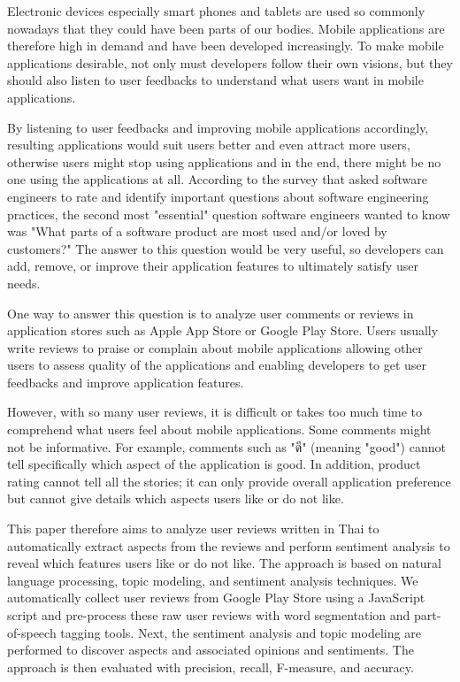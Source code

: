 
Electronic devices especially smart phones and tablets are used so commonly nowadays that they could have been parts of our bodies. Mobile applications are therefore high in demand and have been developed increasingly. To make mobile applications desirable, not only must developers follow their own visions, but they should also listen to user feedbacks to understand what users want in mobile applications.

By listening to user feedbacks and improving mobile applications accordingly, resulting applications would suit users better and even attract more users, otherwise users might stop using applications and in the end, there might be no one using the applications at all. According to the survey \cite{145Q} that asked software engineers to rate and identify important questions about software engineering practices, the second most "essential" question software engineers wanted to know was "What parts of a software product are most used and/or loved by customers?" The answer to this question would be very useful, so developers can add, remove, or improve their application features to ultimately satisfy user needs.

One way to answer this question is to analyze user comments or reviews in application stores such as Apple App Store or Google Play Store. Users usually write reviews to praise or complain about mobile applications allowing other users to assess quality of the applications and enabling developers to get user feedbacks and improve application features. 

However, with so many user reviews, it is difficult or takes too much time to comprehend what users feel about mobile applications. Some comments might not be informative. For example, comments such as "{ดี}" (meaning "good") cannot tell specifically which aspect of the application is good. In addition, product rating cannot tell all the stories; it can only provide overall application preference but cannot give details which aspects users like or do not like.

This paper therefore aims to analyze user reviews written in Thai to automatically extract aspects from the reviews and perform sentiment analysis to reveal which features users like or do not like. The approach is based on natural language processing, topic modeling, and sentiment analysis techniques. We automatically collect user reviews from Google Play Store using a JavaScript script and pre-process these raw user reviews with word segmentation and part-of-speech tagging tools. Next, the sentiment analysis and topic modeling are performed to discover aspects and associated opinions and sentiments. The approach is then evaluated with precision, recall, F-measure, and accuracy.

